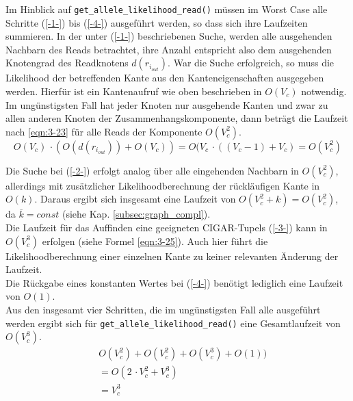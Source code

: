 Im Hinblick auf \lstinline|get_allele_likelihood_read()| müssen im Worst Case alle Schritte (\ref{-1-}) bis (\ref{-4-}) ausgeführt werden, so dass sich ihre Laufzeiten summieren. In der unter (\ref{-1-}) beschriebenen Suche, werden alle ausgehenden Nachbarn des Reads betrachtet, ihre Anzahl entspricht also dem ausgehenden Knotengrad des Readknotens $d(r_{i_{out}})$. War die Suche erfolgreich, so muss die Likelihood der betreffenden Kante aus den Kanteneigenschaften ausgegeben werden. Hierfür ist ein Kantenaufruf wie oben beschrieben in $ O(V_{c}) $ notwendig. Im ungünstigsten Fall hat jeder Knoten nur ausgehende Kanten und zwar zu allen anderen Knoten der Zusammenhangskomponente, dann beträgt die Laufzeit nach \eqref{eqn:3-23} für alle Reads der Komponente $ O(V_{c}^2)$.
\begin{equation} \label{eqn:3-23}
\tag{3-23}
O(V_{c}) \, \cdotp (O(d(r_{i_{out}})) +  O(V_{c})) = O(V_{c} \, \cdotp ((V_{c}-1) + V_{c})  = O(V_{c}^2)
\end{equation} 

Die Suche bei (\ref{-2-}) erfolgt analog über alle eingehenden Nachbarn in $ O(V_{c}^2)$, allerdings mit zusätzlicher Likelihoodberechnung der rückläufigen Kante in $O(k)$. Daraus ergibt sich insgesamt eine Laufzeit von $ O(V_{c}^2 +k) = O(V_{c}^2)$, da $\overline{k}=const$ (siehe Kap. \ref{subsec:graph_compl}).\\

Die Laufzeit für das Auffinden eine geeigneten CIGAR-Tupels (\ref{-3-}) kann in $O(V_{c}^3)$ erfolgen (siehe Formel \eqref{eqn:3-25}). Auch hier führt die Likelihoodberechnung einer einzelnen Kante zu keiner relevanten Änderung der Laufzeit.\\

Die Rückgabe eines konstanten Wertes bei (\ref{-4-}) benötigt lediglich eine Laufzeit von $ O(1) $.\\

Aus den insgesamt vier Schritten, die im ungünstigsten Fall alle ausgeführt werden ergibt sich für \lstinline|get_allele_likelihood_read()| eine Gesamtlaufzeit von $O(V_{c}^3)$. \\
\begin{equation} \label{eqn:3-24}
\tag{3-24}
\begin{aligned}
&\ {} O(V_{c}^2) + O(V_{c}^2) + O(V_{c}^3) + O(1))  \\
& \ = O(2 \, \cdotp V_{c}^2 + V_{c}^3 )\\
&\ = V_{c}^3\\
\end{aligned}
\end{equation}

